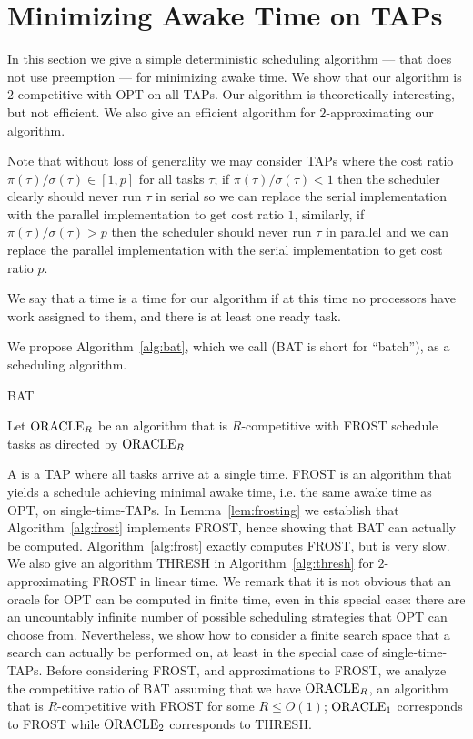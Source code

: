 \section{Minimizing Awake Time on TAPs} 
\label{sec:awaketime}
In this section we give a simple deterministic scheduling
algorithm --- that does not use preemption --- for minimizing
awake time. We show that our algorithm is $2$-competitive
with OPT on all TAPs. Our algorithm is theoretically interesting,
but not efficient. We also give an efficient algorithm for
$2$-approximating our algorithm.

Note that without loss of generality we may consider TAPs where
the cost ratio $\pi(\tau)/\sigma(\tau) \in [1,p]$ for all tasks
$\tau$; if $\pi(\tau)/\sigma(\tau) < 1$ then the scheduler
clearly should never run $\tau$ in serial so we can replace the
serial implementation with the parallel implementation to get
cost ratio $1$, similarly, if $\pi(\tau)/\sigma(\tau) > p$ then
the scheduler should never run $\tau$ in parallel and we can
replace the parallel implementation with the serial
implementation to get cost ratio $p$.

We say that a time is a  time for our algorithm if at
this time no processors have work assigned to them, and there is at
least one ready task.

We propose Algorithm~\ref{alg:bat}, which we call 
(BAT is short for \enquote{batch}), as a scheduling algorithm.

\begin{algorithm}
  \caption{BAT}
  \label{alg:bat}
  \begin{algorithmic}
    \State Let $\operatorname{\text{ORACLE}}_R$ be an algorithm that is $R$-competitive with FROST 
      \State schedule tasks as directed by $\operatorname{\text{ORACLE}}_R$
    \EndIf
  \end{algorithmic}
\end{algorithm}

A  is a TAP where all tasks arrive at a
single time. FROST is an algorithm that yields a schedule
achieving minimal awake time, i.e. the same awake time as OPT, on
single-time-TAPs. In Lemma~\ref{lem:frosting} we establish that
Algorithm~\ref{alg:frost} implements FROST, hence showing
that BAT can actually be computed. Algorithm~\ref{alg:frost}
exactly computes FROST, but is very slow. We also give an
algorithm THRESH in Algorithm~\ref{alg:thresh} for
$2$-approximating FROST in linear time. We remark that it is not
obvious that an oracle for OPT can be computed in finite time,
even in this special case: there are an uncountably infinite
number of possible scheduling strategies that OPT can choose
from. Nevertheless, we show how to consider a finite search space
that a search can actually be performed on, at least in the
special case of single-time-TAPs. Before considering FROST, and
approximations to FROST, we analyze the competitive ratio of BAT
assuming that we have $\operatorname{\text{ORACLE}}_R$, an algorithm that is
$R$-competitive with FROST for some $R \le O(1)$; $\operatorname{\text{ORACLE}}_1$
corresponds to FROST while $\operatorname{\text{ORACLE}}_2$ corresponds to THRESH.

